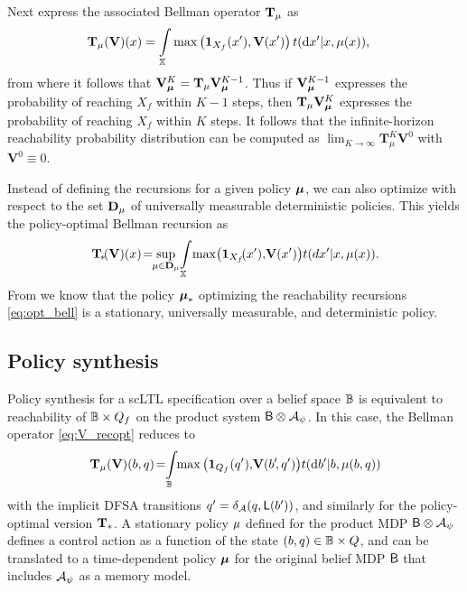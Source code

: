 \documentclass{ifacconf}
\newcommand{\red}[1]{{\color{red} #1}}
\begin{document}
Next express the associated Bellman operator ${\mathbf {T}}_{\mu}$ as
\begin{align}
\label{eq:V_recopt}
  & \Bel_\pol (\mathbf  V)(x) = \int_\X \max \left( \mathbf 1_{X_f}( x'), \mathbf V(x') \right) {\tr}(\mathrm{d} x' | x,\pol( x)),
\end{align}
from where it follows that $\mathbf V_{\boldsymbol{\mu}}^{K} = {\mathbf {T}}_{\mu} \mathbf V_{\boldsymbol{\mu}}^{K-1}$. Thus if $\mathbf V_{\boldsymbol{\mu}}^{K-1} $ expresses the probability of reaching $X_f$ within $K-1$ steps, then $ {\mathbf {T}}_{\mu} \mathbf V_{\boldsymbol{\mu}}^{K} $ expresses the probability of reaching $X_f$ within $K$ steps. It follows that the infinite-horizon reachability probability distribution can be computed as $\lim_{K\rightarrow \infty}\mathbf T_\mu^{K} \mathbf V^0$ with $\mathbf{V}^0 \equiv 0$.

Instead of defining the recursions for a given policy ${\boldsymbol{\mu}}$, we can also optimize with respect to the set $\mathbf D_{{\mu}}$ of universally measurable deterministic policies. This yields the policy-optimal Bellman recursion as
\begin{equation}
  \Bel_{\!\ast} \!(\mathbf V)(x) \!=\!\!\sup_{\pol \in \mathbf D_{\pol}}\! \int_{\X}\! \max\! \left( \mathbf 1_{X_f}\!( x'),\! \mathbf V(x') \right)\! {\tr}(d  x' | x,\pol( x)).\!\label{eq:opt_bell}
\end{equation}
From \cite{Abate1} we know that the policy ${\boldsymbol{\mu}}_\ast$ optimizing  the reachability recursions \eqref{eq:opt_bell}  is a stationary, universally measurable, and deterministic policy.


\subsection{Policy synthesis}
Policy synthesis for a scLTL specification over a belief space $\mathbb{B}$ is equivalent to reachability of $\mathbb{B}\times Q_f$ on the product system $\mathsf{B} \otimes \mathcal{A}_\psi$. In this case, the Bellman operator \eqref{eq:V_recopt} reduces to
\begin{equation}
\label{eq:V_recopt_inf_mu}
  \Bel_\pol (\mathbf V)(b,q)\! = \hspace{-1mm} \int_{\Xb} \hspace{-1mm} \max \left( \mathbf 1_{Q_f}(q'), \!\mathbf V( b'\!, q') \right)\! {\tr}(\mathrm{d} b' |b,\pol(b,q))\!
\end{equation}
with the implicit DFSA transitions  $q' =\delta_{\mathcal{A}}(q,\mathsf{L}(b'))$, %
and similarly for the policy-optimal version ${\mathbf {T}}_\ast$. A stationary policy ${\mu}$ defined for the product MDP $\mathsf{B} \otimes \mathcal{A}_\psi$ defines a control action as a function of the state $(b,q) \in \mathbb{B} \times Q$, and can be translated to a time-dependent policy ${\boldsymbol{\mu}}$ for the original belief MDP $\mathsf{B}$ that includes $\mathcal{A}_\psi$ as a memory model.
\end{document}
